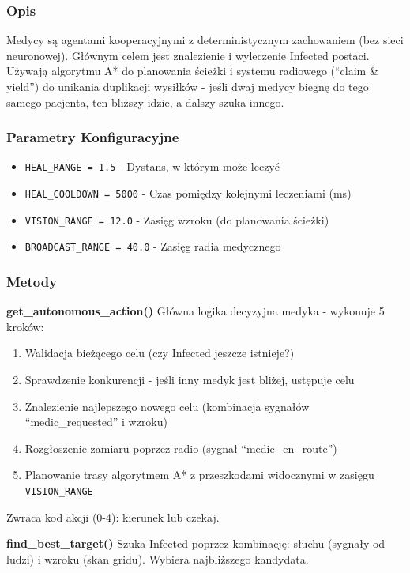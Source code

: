 \documentclass[12pt,a4paper]{article}
\begin{document}
\subsubsection{Opis}
Medycy są agentami kooperacyjnymi z deterministycznym zachowaniem (bez sieci
neuronowej). Głównym celem jest znalezienie i wyleczenie Infected postaci.
Używają algorytmu A* do planowania ścieżki i systemu radiowego (``claim \&
yield'') do unikania duplikacji wysiłków - jeśli dwaj medycy biegnę do tego
samego pacjenta, ten bliższy idzie, a dalszy szuka innego.

\subsubsection{Parametry Konfiguracyjne}
\begin{itemize}
	\item \texttt{HEAL\_RANGE = 1.5} - Dystans, w którym może leczyć
	\item \texttt{HEAL\_COOLDOWN = 5000} - Czas pomiędzy kolejnymi leczeniami (ms)
	\item \texttt{VISION\_RANGE = 12.0} - Zasięg wzroku (do planowania ścieżki)
	\item \texttt{BROADCAST\_RANGE = 40.0} - Zasięg radia medycznego
\end{itemize}

\subsubsection{Metody}

\textbf{get\_autonomous\_action()}
Główna logika decyzyjna medyka - wykonuje 5 kroków:
\begin{enumerate}
	\item Walidacja bieżącego celu (czy Infected jeszcze istnieje?)
	\item Sprawdzenie konkurencji - jeśli inny medyk jest bliżej, ustępuje celu
	\item Znalezienie najlepszego nowego celu (kombinacja sygnałów ``medic\_requested'' i
	      wzroku)
	\item Rozgłoszenie zamiaru poprzez radio (sygnał ``medic\_en\_route'')
	\item Planowanie trasy algorytmem A* z przeszkodami widocznymi w zasięgu
	      \texttt{VISION\_RANGE}
\end{enumerate}

Zwraca kod akcji (0-4): kierunek lub czekaj.

\textbf{find\_best\_target()}
Szuka Infected poprzez kombinację: słuchu (sygnały od ludzi) i wzroku (skan gridu). Wybiera najbliższego kandydata.
\end{document}
